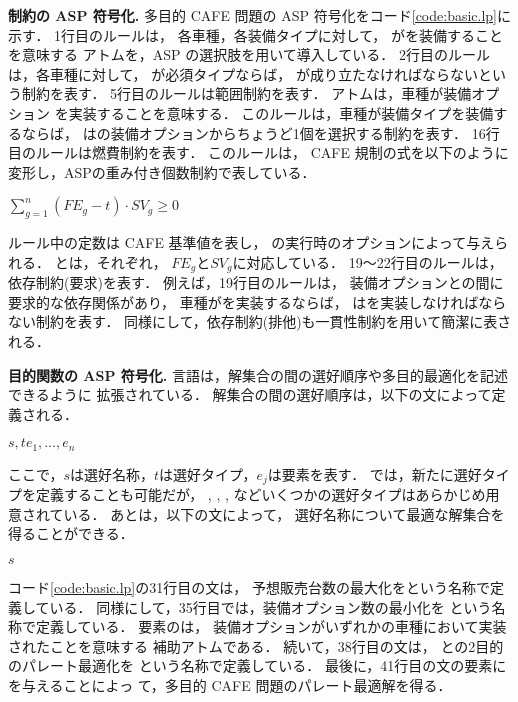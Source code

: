 \textbf{制約の ASP 符号化.}
多目的 CAFE 問題の ASP 符号化をコード\ref{code:basic.lp}に示す．
%
1行目のルールは，
各車種，各装備タイプに対して，
がを装備することを意味する
アトムを，ASP の選択肢を用いて導入している．
%
2行目のルールは，各車種に対して，
が必須タイプならば，
が成り立たなければならないという制約を表す．
%
5行目のルールは範囲制約を表す．
アトムは，車種が装備オプション
を実装することを意味する．
このルールは，車種が装備タイプを装備するならば，
はの装備オプションからちょうど1個を選択する制約を表す．
%
16行目のルールは燃費制約を表す．
このルールは，
CAFE 規制の式を以下のように変形し，ASPの重み付き個数制約で表している．
\begin{center}
\(\sum_{g=1}^{n} (FE_{g}-t)\cdot SV_{g} \geq 0\)  
\end{center}
ルール中の定数は CAFE 基準値を表し，
{\asprin}の実行時のオプションによって与えられる．
とは，それぞれ，
$FE_{g}$と$SV_{g}$に対応している．
%
19〜22行目のルールは，依存制約(要求)を表す．
例えば，19行目のルールは，
装備オプションとの間に要求的な依存関係があり，
車種がを実装するならば，
はを実装しなければならない制約を表す．
同様にして，依存制約(排他)も一貫性制約を用いて簡潔に表される．

\textbf{目的関数の ASP 符号化.}
{\asprin}言語は，解集合の間の選好順序や多目的最適化を記述できるように
拡張されている．
解集合の間の選好順序は，以下の文によって定義される．
\begin{center}
  $s,t$\code{)\{}$e_1,\dots,e_n$
\end{center}
ここで，$s$は選好名称，$t$は選好タイプ，$e_j$は要素を表す．
{\asprin} では，新たに選好タイプを定義することも可能だが，
, 
,
,
などいくつかの選好タイプはあらかじめ用意されている．
あとは，以下の文によって，
選好名称について最適な解集合を得ることができる．
\begin{center}
  $s$
\end{center}

コード\ref{code:basic.lp}の31行目の文は，
予想販売台数の最大化をという名称で定義している．
同様にして，35行目では，装備オプション数の最小化を
という名称で定義している．
要素のは，
装備オプションがいずれかの車種において実装されたことを意味する
補助アトムである．
続いて，38行目の文は，
との2目的のパレート最適化を
という名称で定義している．
最後に，41行目の文の要素にを与えることによっ
て，多目的 CAFE 問題のパレート最適解を得る．

